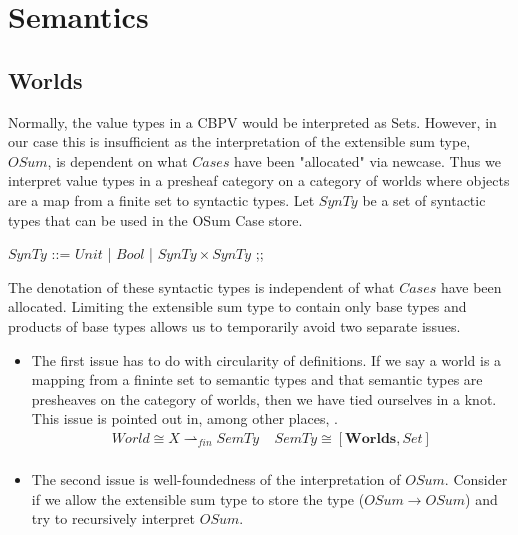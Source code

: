 \documentclass{article}
\begin{document}
\section{Semantics}
\subsection{Worlds}
Normally, the value types in a CBPV would be interpreted as Sets. However, in our case this is insufficient as 
the interpretation of the extensible sum type, $OSum$, is dependent on what $Cases$ have been "allocated" via newcase. Thus we interpret value types in a presheaf category on a category of worlds where objects are a map from a finite set to syntactic types. Let $SynTy$ be a set of syntactic types that can be used in the OSum Case store.

\begin{bnf}
$SynTy$ ::= $Unit$
| $Bool$
| $SynTy \times SynTy$
;;
\end{bnf}

The denotation of these syntactic types is independent of what $Cases$ have been allocated.
Limiting the extensible sum type to contain only base types and products of base types allows 
us to temporarily avoid two separate issues. 
\begin{itemize}
    \item The first issue has to do with circularity of definitions. If we say a world is a 
    mapping from a fininte set to semantic types and that semantic types are presheaves on 
    the category of worlds, then we have tied ourselves in a knot. This issue is pointed 
    out in, among other places, \cite{sterling_denotational_2023}.
    \begin{align*}
        World \cong X \rightharpoonup_{fin} SemTy \;\;\;\; SemTy \cong [\mathbf{Worlds} , Set]\\
    \end{align*}
    
    \item The second issue is well-foundedness of the interpretation of $OSum$. Consider if we allow the extensible sum type to store the type ($OSum \rightarrow OSum$) and try to recursively interpret $OSum$.

\end{itemize}
\end{document}
